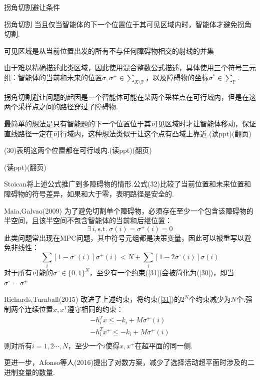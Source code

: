 \documentclass[notheorems,11pt]{beamer}
\theoremstyle{plain}
\numberwithin{theorem}{section}
\numberwithin{lemma}{section}
\numberwithin{corollary}{section}
\theoremstyle{example}
\begin{document}
\begin{frame}{拐角切割避让条件}
  \begin{block}{拐角切割}
    当且仅当智能体的下一个位置位于其可见区域内时，智能体才避免拐角切割.\par
    可见区域是从当前位置出发的所有不与任何障碍物相交的射线的并集
  \end{block}
  由于难以精确描述此类区域，因此使用混合整数公式描述，具体使用三个符号三元组：智能体的当前和未来的位置$\sigma,\sigma^+\in \textstyle\sum_{X\setminus\mathbb{P}}$，以及障碍物的坐标$\sigma^*\in\textstyle\sum_{\mathbb{P}}$.
\end{frame}
\begin{frame}
  拐角切割避让问题的起因是一个智能体可能在某两个采样点在可行域内，但是在这两个采样点之间的路径穿过了障碍物.\par
  最简单的想法是只有智能题的下一个位置位于其可见区域时才让智能体移动，保证直线路径一定在可行域内，这种想法类似于让这个点有凸域上靠近.(读ppt)(翻页) \par \vspace{1 em}
  (30)表明这两个位置都在可行域内.(读ppt)(翻页) \par \vspace{1 em}
  (读ppt)(翻页) \par \vspace{1 em}
  Stoican将上述公式推广到多障碍物的情形.公式(32)比较了当前位置和未来位置和障碍物的符号差异，如果和大于零，表明路径是安全的.\par
\end{frame}

\begin{frame}{Maia,Galvao(2009)}
  为了避免切割单个障碍物，必须存在至少一个包含该障碍物的半空间，且该半空间不包含智能体的当前和后继位置：
  \begin{equation}
    \exists\, i,\mathrm{s.t.}\; \sigma(i)=\sigma^+(i)=0 \label{30}
  \end{equation}
  此类问题常出现在MPC问题，其中符号元组都是决策变量，因此可以被重写以避免非线性：
  \begin{equation}
    \sum_{i}[1-\sigma^\circ(i)]\sigma^+(i)<N+\sum_{i}[1-2\sigma^\circ(i)]\sigma(i) \label{31}
  \end{equation}
  对于所有可能的$\sigma^\circ\in\{0,1\}^N$，至少有一个约束(\ref{31})会被简化为(\ref{30})，即当$\sigma^\circ=\sigma^+$
  
\end{frame}

\begin{frame}{Richards,Turnball(2015)}
  改进了上述约束，将约束(\ref{31})的$2^N$个约束减少为$N$个.强制两个连续位置$x,x^T$遵守相同的约束：
  \begin{gather*}
    -h_i^Tx\leqslant -k_i+M\sigma^+(i) \\
    -h_i^Tx^+\leqslant -k_i+M\sigma^+(i) \\
  \end{gather*}
  则对所有$i=1,2\cdots,N$，至少一个$i$使得$x,x^+$在超平面的同一侧.\par
  更进一步，Afonso等人(2016)提出了对数方案，减少了选择活动超平面时涉及的二进制变量的数量.
\end{frame}
\end{document}
